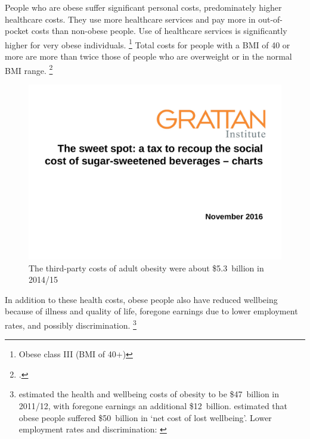 \documentclass[embargoed]{grattan}
\begin{document}
People who are obese suffer significant personal costs, predominately higher healthcare costs.
They use more healthcare services and pay more in out-of-pocket costs than non-obese people.
Use of healthcare services is significantly higher for very obese individuals.%
\footnote{Obese class III (BMI of 40+)} Total costs for people with a BMI of 40 or more are more than twice those of people who are overweight or in the normal BMI range.%
\footcites{PwC2015Weighingcostobesity}{Park2012impactchildhoodobesity}{Australia2014NoTimeWeight}

\begin{figure}
\caption{The third-party costs of adult obesity were about \$5.3~billion in 2014/15}\label{fig:3rd-party-costs-adult-obesity-were-5bn}

\includegraphics[page=4]{atlas/ObesityCharts}


\end{figure}

In addition to these health costs, obese people also have reduced wellbeing because of illness and quality of life, foregone earnings due to lower employment rates, and possibly discrimination.%
\footnote{\textcite{PwC2015Weighingcostobesity} estimated the health and wellbeing costs of obesity to be \$47~billion in 2011/12, with foregone earnings an additional \$12~billion. \textcite{Economics2008growingcostobesity} estimated that obese people suffered \$50~billion in `net cost of lost wellbeing'.
Lower employment rates and discrimination: \textcites{Rooth2009Obesityattractivenessdifferential}{Boeckerman2016EffectWeightLabor}{Reichert2015Obesityweightloss}{Cawley2015economyscalesselective}}
\end{document}
